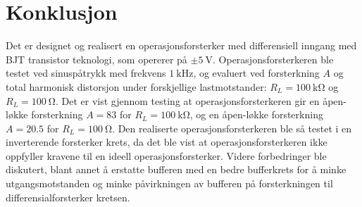 \section{Konklusjon}
\label{konklusjon}

Det er designet og realisert en operasjonsforsterker med differensiell inngang med BJT transistor teknologi,
som opererer på $\pm \SI{5}{\volt}$. Operasjonsforsterkeren ble testet ved sinuspåtrykk med frekvens $\SI{1}{\kilo\hertz}$,
og evaluert ved forsterkning $A$ og total harmonisk distorsjon under forskjellige lastmotstander: $R_L = \SI{100}{\kilo\ohm}$ og $R_L = \SI{100}{\ohm}$.
Det er vist gjennom testing at operasjonsforsterkeren gir en åpen-løkke forsterkning $A = 83$ for $R_L = \SI{100}{\kilo\ohm}$,
og en åpen-løkke forsterkning $A = 20.5$ for $R_L = \SI{100}{\ohm}$. 
Den realiserte operasjonsforsterkeren ble så testet i en inverterende forsterker krets, da 
det ble vist at operasjonsforsterkeren ikke oppfyller kravene til en ideell operasjonsforsterker.
Videre forbedringer ble diskutert, blant annet å erstatte bufferen med en bedre bufferkrets for å
minke utgangsmotstanden og minke påvirkningen av bufferen på forsterkningen til differensialforsterker kretsen.
